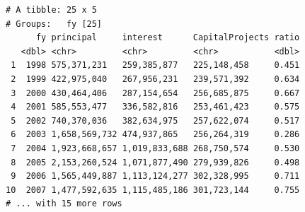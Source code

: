 \documentclass[
  letterpaper,
  DIV=11,
  numbers=noendperiod]{scrreport}
\newenvironment{Shaded}{\begin{snugshade}}{\end{snugshade}}
\newcommand{\AttributeTok}[1]{\textcolor[rgb]{0.40,0.45,0.13}{#1}}
\newcommand{\DecValTok}[1]{\textcolor[rgb]{0.68,0.00,0.00}{#1}}
\newcommand{\FunctionTok}[1]{\textcolor[rgb]{0.28,0.35,0.67}{#1}}
\newcommand{\NormalTok}[1]{\textcolor[rgb]{0.00,0.23,0.31}{#1}}
\newcommand{\SpecialCharTok}[1]{\textcolor[rgb]{0.37,0.37,0.37}{#1}}
\newcommand{\StringTok}[1]{\textcolor[rgb]{0.13,0.47,0.30}{#1}}
\begin{document}
\begin{verbatim}
# A tibble: 25 x 5
# Groups:   fy [25]
      fy principal     interest      CapitalProjects ratio
   <dbl> <chr>         <chr>         <chr>           <dbl>
 1  1998 575,371,231   259,385,877   225,148,458     0.451
 2  1999 422,975,040   267,956,231   239,571,392     0.634
 3  2000 430,464,406   287,154,654   256,685,875     0.667
 4  2001 585,553,477   336,582,816   253,461,423     0.575
 5  2002 740,370,036   382,634,975   257,622,074     0.517
 6  2003 1,658,569,732 474,937,865   256,264,319     0.286
 7  2004 1,923,668,657 1,019,833,688 268,750,574     0.530
 8  2005 2,153,260,524 1,071,877,490 279,939,826     0.498
 9  2006 1,565,449,887 1,113,124,277 302,328,995     0.711
10  2007 1,477,592,635 1,115,485,186 301,723,144     0.755
# ... with 15 more rows
\end{verbatim}

\begin{Shaded}
\end{Shaded}
\end{document}
